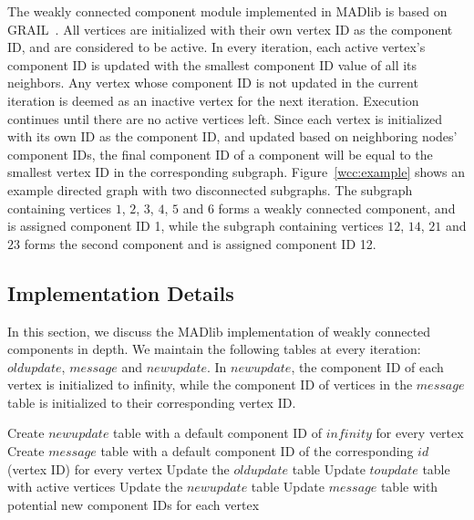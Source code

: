 The weakly connected component module implemented in MADlib is based on
GRAIL~\cite{grail}. All vertices are initialized with their own vertex
ID as the component ID, and are considered to be active. In every iteration,
each active vertex's component ID is updated with the smallest component ID
value of all its neighbors. Any vertex whose component ID is not updated in
the current iteration is deemed as an inactive vertex for the next iteration.
Execution continues until there are no active vertices left. Since each vertex
is initialized with its own ID as the component ID, and updated based on
neighboring nodes' component IDs, the final component ID of a component will
be equal to the smallest vertex ID in the corresponding subgraph.
Figure~\ref{wcc:example} shows an example directed graph with two disconnected
subgraphs. The subgraph containing vertices $1$, $2$, $3$, $4$, $5$ and $6$
forms a weakly connected component, and is assigned component ID 1, while the
subgraph containing vertices $12$, $14$, $21$ and $23$ forms the second component
and is assigned component ID 12.

\subsection{Implementation Details} \label{sec:wcc:implementation}

In this section, we discuss the MADlib implementation of weakly connected
components in depth. We maintain the following tables at every iteration:
$oldupdate$, $message$ and $newupdate$. In $newupdate$, the component ID
of each vertex is initialized to infinity, while the component ID of vertices
in the $message$ table is initialized to their corresponding vertex ID.

\begin{algorithm} \label{alg:wcc:high}
\begin{algorithmic}[1]
    \State Create $newupdate$ table with a default component ID of
            $infinity$ for every vertex
    \State Create $message$ table with a default component ID of the
            corresponding $id$ (vertex ID) for every vertex
    \Repeat
        \State Update the $oldupdate$ table
        \State Update $toupdate$ table with active vertices
        \State Update the $newupdate$ table
        \State Update $message$ table with potential new component IDs for each vertex
\end{algorithmic}
\end{algorithm}

